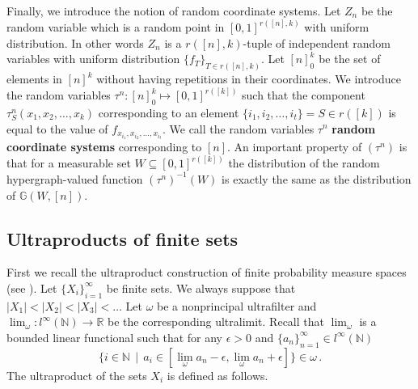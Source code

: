 \documentclass [11pt] {article}
\def\o{\omega}
\def\e{\epsilon}
\def\limo{\lim_{\omega}}
\def\bR{{\mathbb R}}
\def\bN{{\mathbb N}}\def\bQ{{\mathbb Q}}
\def\to{\rightarrow}
\begin{document}
\noindent
Finally, we introduce the notion of random coordinate systems.
Let $Z_n$ be the random variable which is a random point in 
$[0,1]^{r([n],k)}$ with uniform distribution. 
In other words $Z_n$ is a $r([n],k)$-tuple of independent random
variables with uniform distribution $\{f_T\}_{T\in r([n],k)}$.
Let $[n]^k_0$ be the set of elements in $[n]^k$ without having
repetitions in their coordinates.
We introduce the random variables
 $\tau^n:[n]^k_0\mapsto [0,1]^{r([k])}$ such that the
component $\tau^n_S(x_1,x_2,\dots,x_k)$ corresponding to an 
element $\{i_1,i_2,\dots,i_t\}=S\in r([k])$ is equal
 to the value of $f_{x_{i_1}, x_{i_2},\dots, x_{i_t}}$.
We call the random variables $\tau^n$ {\bf random coordinate systems}
corresponding to $[n]$. An important property of $(\tau^n)$ is that for a
measurable set $W\subseteq [0,1]^{r([k])}$ the distribution of the
random hypergraph-valued function
$(\tau^n)^{-1}(W)$ is exactly the same as the
distribution of $\mathbb{G}(W,[n])$.





\subsection{Ultraproducts of finite sets}\label{sec1}
First we recall the ultraproduct construction of finite probability
measure spaces (see \cite{Loeb}).
Let $\{X_i\}^\infty_{i=1}$ be finite sets.
We always suppose that $|X_1|<|X_2|<|X_3|<\dots$ Let $\omega$ be a nonprincipal
ultrafilter and $\lim_{\o}:l^\infty(\bN)\to\bR$ be the corresponding
ultralimit. Recall that $\limo$ is a bounded linear functional
such that for any $\epsilon>0$ and $\{a_n\}_{n=1}^\infty\in l^\infty(\bN)$
$$\{ i\in \bN\,\mid\, a_i\in [\limo a_n-\e, \limo a_n +\e]\}\in\omega\,.$$
The ultraproduct of the sets $X_i$ is defined as follows.
\end{document}
